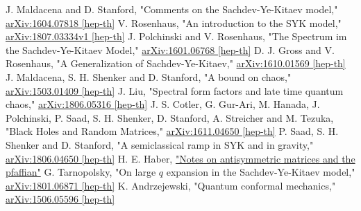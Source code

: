 \begin{thebibliography}{99}
		J. Maldacena and D. Stanford,
		"Comments on the Sachdev-Ye-Kitaev model,"
		\href{https://arxiv.org/pdf/1604.07818.pdf}{arXiv:1604.07818 [hep-th]}
		V. Rosenhaus,
		"An introduction to the SYK model,"
		\href{https://arxiv.org/pdf/1807.03334.pdf}{arXiv:1807.03334v1 [hep-th]}
		J. Polchinski and V. Rosenhaus,
		"The Spectrum im the Sachdev-Ye-Kitaev Model,"
		\href{https://arxiv.org/pdf/1601.06768.pdf}{arXiv:1601.06768 [hep-th]}
		D. J. Gross and V. Rosenhaus,
		"A Generalization of Sachdev-Ye-Kitaev,"
		\href{https://arxiv.org/pdf/1610.01569.pdf}{arXiv:1610.01569 [hep-th]}
		J. Maldacena, S. H. Shenker and D. Stanford,
		"A bound on chaos,"
		\href{https://arxiv.org/pdf/1503.01409.pdf}{arXiv:1503.01409 [hep-th]}
		J. Liu,
		"Spectral form factors and late time quantum chaos,"
		\href{https://arxiv.org/pdf/1806.05316.pdf}{arXiv:1806.05316 [hep-th]}
		J. S. Cotler, G. Gur-Ari, M. Hanada, J. Polchinski, P. Saad, S. H. Shenker,
		D. Stanford, A. Streicher and M. Tezuka,
		"Black Holes and Random Matrices,"
		\href{https://arxiv.org/pdf/1611.04650.pdf}{arXiv:1611.04650 [hep-th]}
		P. Saad, S. H. Shenker and D. Stanford,
		"A semiclassical ramp in SYK and in gravity,"
		\href{https://arxiv.org/pdf/1806.06840.pdf}{arXiv:1806.04650 [hep-th]}
	H. E. Haber,
	\href{http://scipp.ucsc.edu/~haber/webpage/pfaffian2.pdf}{"Notes on antisymmetric matrices and the pfaffian"}
		G. Tarnopolsky,
		"On large $q$ expansion in the Sachdev-Ye-Kitaev model,"
		\href{https://arxiv.org/pdf/1801.06871.pdf}{arXiv:1801.06871 [hep-th]}
		K. Andrzejewski,
		"Quantum conformal mechanics,"
		\href{https://arxiv.org/pdf/1506.05596.pdf}{arXiv:1506.05596 [hep-th]}
\end{thebibliography}
